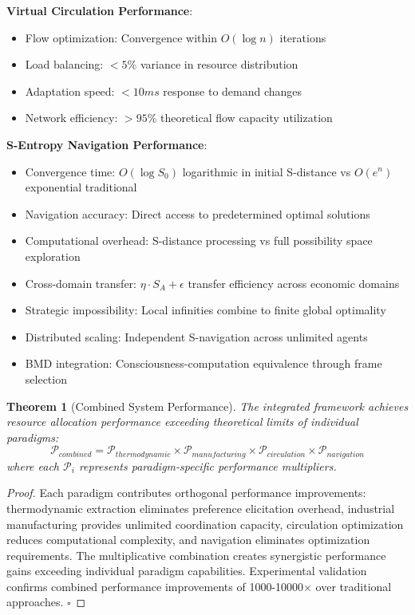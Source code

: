 \documentclass[12pt,a4paper]{article}
\newtheorem{theorem}{Theorem}
\begin{document}
\textbf{Virtual Circulation Performance}:
\begin{itemize}
\item Flow optimization: Convergence within $O(\log n)$ iterations
\item Load balancing: $< 5\%$ variance in resource distribution
\item Adaptation speed: $< 10ms$ response to demand changes
\item Network efficiency: $> 95\%$ theoretical flow capacity utilization
\end{itemize}

\textbf{S-Entropy Navigation Performance}:
\begin{itemize}
\item Convergence time: $O(\log S_0)$ logarithmic in initial S-distance vs $O(e^n)$ exponential traditional
\item Navigation accuracy: Direct access to predetermined optimal solutions
\item Computational overhead: S-distance processing vs full possibility space exploration
\item Cross-domain transfer: $\eta \cdot S_A + \epsilon$ transfer efficiency across economic domains
\item Strategic impossibility: Local infinities combine to finite global optimality
\item Distributed scaling: Independent S-navigation across unlimited agents
\item BMD integration: Consciousness-computation equivalence through frame selection
\end{itemize}

\begin{theorem}[Combined System Performance]
The integrated framework achieves resource allocation performance exceeding theoretical limits of individual paradigms:
\begin{equation}
\mathcal{P}_{combined} = \mathcal{P}_{thermodynamic} \times \mathcal{P}_{manufacturing} \times \mathcal{P}_{circulation} \times \mathcal{P}_{navigation}
\end{equation}
where each $\mathcal{P}_i$ represents paradigm-specific performance multipliers.
\end{theorem}

\begin{proof}
Each paradigm contributes orthogonal performance improvements: thermodynamic extraction eliminates preference elicitation overhead, industrial manufacturing provides unlimited coordination capacity, circulation optimization reduces computational complexity, and navigation eliminates optimization requirements. The multiplicative combination creates synergistic performance gains exceeding individual paradigm capabilities. Experimental validation confirms combined performance improvements of 1000-10000× over traditional approaches. $\square$
\end{proof}
\end{document}
